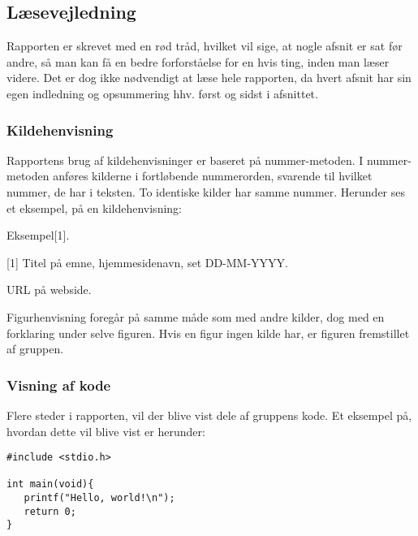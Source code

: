 	\subsection{Læsevejledning}
Rapporten er skrevet med en rød tråd, hvilket vil sige, at nogle afsnit er sat før andre, så man kan få en bedre forforståelse for en hvis ting, inden man læser videre. Det er dog ikke nødvendigt at læse hele rapporten, da hvert afsnit har sin egen indledning og opsummering hhv. først og sidst i afsnittet.


\subsubsection{Kildehenvisning}
Rapportens brug af kildehenvisninger er baseret på nummer-metoden. I nummer-metoden anføres kilderne i fortløbende nummerorden, svarende til hvilket nummer, de har i teksten. To identiske kilder har samme nummer. Herunder ses et eksempel, på en kildehenvisning:

Eksempel[1].

[1] Titel på emne, hjemmesidenavn, set DD-MM-YYYY.

	URL på webside.

Figurhenvisning foregår på samme måde som med andre kilder, dog med en forklaring under selve figuren. Hvis en figur ingen kilde har, er figuren fremstillet af gruppen.


\subsubsection{Visning af kode}
Flere steder i rapporten, vil der blive vist dele af gruppens kode. Et eksempel på, hvordan dette vil blive vist er herunder:

\begin{lstlisting}[style=Cstyle, caption=Kodeeksempel i C]
#include <stdio.h>

int main(void){
   printf("Hello, world!\n");
   return 0;
}
\end{lstlisting}